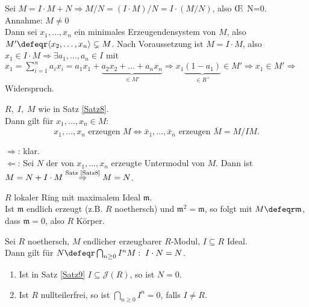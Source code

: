 \begin{Bew}
  Sei $M=I \cdot M + N \Rightarrow M/N = (I \cdot M)/N = I \cdot (M/N)$, also \OE\ N=0.\\
  Annahme: $M \not= 0$\\
  Dann sei $x_1, \dots, x_n$ ein minimales Erzeugendensystem von $M$, also $M' \defeqr \langle x_2, \dots, x_n\rangle \subsetneq M$.
  Nach Voraussetzung ist $M = I \cdot M$, also $x_1 \in I \cdot M \Rightarrow
  \exists a_1, \dots, a_n \in I$ mit $x_1 = \sum_{i=1}^n a_i x_i = a_1 x_1 +
  \underset{\in M'}{\underbrace{a_2 x_2 + \dots + a_n x_n}} \Rightarrow
  x_1\underset{\in R^{\times}}{\underbrace{(1-a_1)}} \in M' \Rightarrow x_1 \in
  M' \Rightarrow$ Widerspruch.
\end{Bew}

\begin{Folg}
\label{2.21}
  $R, \; I, \; M$ wie in Satz  \ref{Satz8}.\\
  Dann gilt für $x_1, \dots, x_n \in M$:
  \[
  x_1, \dots, x_n \text{ erzeugen } M \Leftrightarrow \bar{x}_1, \dots, \bar{x}_n \text{ erzeugen } \overline{M} = M/IM.
  \]
\end{Folg}

\begin{Bew}
  \glqq$\Rightarrow$\grqq: klar.\\
  \glqq$\Leftarrow$\grqq: Sei $N$ der von $x_1, \dots, x_n$ erzeugte Untermodul von $M$. Dann ist $M = N + I \cdot M \overset{\text{\scriptsize Satz \ref{Satz8}}}{\Rightarrow} M = N$.
\end{Bew}

\begin{nnBsp}
  $R$ lokaler Ring mit maximalem Ideal $\mathfrak{m}$.\\
  Ist $\mathfrak{m}$ endlich erzeugt (z.B. $R$ noethersch) und $\mathfrak{m}^2 =
  \mathfrak{m}$, so folgt mit $M\defeqr\mathfrak{m}$, dass $\mathfrak{m}=0$,
  also $R$ Körper. 
\end{nnBsp}

\begin{Satz}
\label{Satz9}
  Sei $R$ noethersch, $M$ endlicher erzeugbarer $R$-Modul, $I \subseteq R$ Ideal.\\
  Dann gilt für $N \defeqr \bigcap_{n \geq 0} I^n M: \; I \cdot N = N$.
\end{Satz}

\begin{Folg}
\label{2.22}
  \begin{enumerate}
    \item \label{2.22a} Ist in Satz \ref{Satz9} $I \subseteq \mathcal{J}(R)$, so ist $N = 0$.
    \item Ist $R$ nullteilerfrei, so ist $\bigcap_{n \geq 0} I^n = 0$, falls $I \neq R$.
  \end{enumerate}
\end{Folg}

